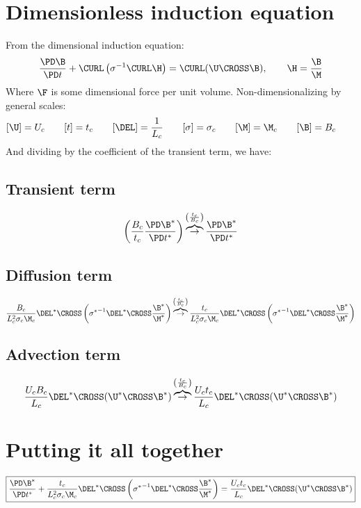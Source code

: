\documentclass[11pt]{article}
\newcommand{\OB}{\overbrace{\rightarrow}^{\left(\frac{t_c}{B_c}\right)}}
\begin{document}
\doublespacing
\MOONSTITLE
\maketitle

\section{Dimensionless induction equation}
From the dimensional induction equation:
\begin{equation}
	\frac{\PD \B}{\PD t} + \CURL \left( \sigma^{-1}\CURL \H \right)
	= \CURL (\U \CROSS \B), \qquad \H = \frac{\B}{\M}
\end{equation}
Where $\F$ is some dimensional force per unit volume. Non-dimensionalizing by general scales:
\begin{equation}\begin{aligned}
	[\U] = U_c \qquad
	[t] = t_c \qquad
	[\DEL] = \frac{1}{L_c} \qquad
	[\sigma] = \sigma_c \qquad
	[\M] = \M_c \qquad
	[\B] = B_c \qquad
\end{aligned}\end{equation}
And dividing by the coefficient of the transient term, we have:
\subsection{Transient term}
\begin{equation}
	\left( \frac{B_c}{t_c} \frac{\PD \B^*}{\PD t^*} \right)
	\OB
	\frac{\PD \B^*}{\PD t^*}
\end{equation}
\subsection{Diffusion term}
\begin{equation}
	\frac{B_c}{L_c^2 \sigma_c \M_c} \DEL^* \CROSS \left( {\sigma^*}^{-1}\DEL^* \CROSS \frac{\B^*}{\M^*} \right)
	\OB
	\frac{t_c}{L_c^2 \sigma_c \M_c} \DEL^* \CROSS \left( {\sigma^*}^{-1}\DEL^* \CROSS \frac{\B^*}{\M^*} \right)
\end{equation}
\subsection{Advection term}
\begin{equation}
	\frac{U_c B_c}{L_c} \DEL^* \CROSS (\U^* \CROSS \B^*)
	\OB
	\frac{U_c t_c}{L_c} \DEL^* \CROSS (\U^* \CROSS \B^*)
\end{equation}
\section{Putting it all together}
\begin{equation}
	\boxed{
	\frac{\PD \B^*}{\PD t^*}
	+ \frac{t_c}{L_c^2 \sigma_c \M_c} \DEL^* \CROSS \left( {\sigma^*}^{-1}\DEL^* \CROSS \frac{\B^*}{\M^*} \right)
	= \frac{U_c t_c}{L_c} \DEL^* \CROSS (\U^* \CROSS \B^*)
	}
\end{equation}
\end{document}
